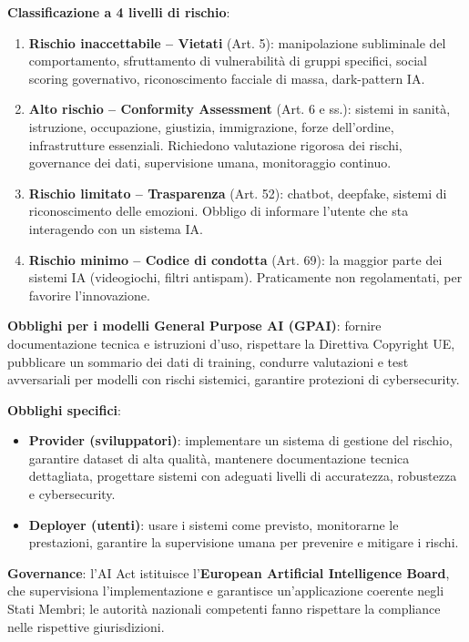 \documentclass[a4paper,11pt]{article}
\begin{document}
\textbf{Classificazione a 4 livelli di rischio}:
\begin{enumerate}
  \item \textbf{Rischio inaccettabile -- Vietati} (Art. 5): manipolazione subliminale del comportamento, sfruttamento di vulnerabilit\`{a} di gruppi specifici, social scoring governativo, riconoscimento facciale di massa, dark-pattern IA.
  \item \textbf{Alto rischio -- Conformity Assessment} (Art. 6 e ss.): sistemi in sanit\`{a}, istruzione, occupazione, giustizia, immigrazione, forze dell'ordine, infrastrutture essenziali. Richiedono valutazione rigorosa dei rischi, governance dei dati, supervisione umana, monitoraggio continuo.
  \item \textbf{Rischio limitato -- Trasparenza} (Art. 52): chatbot, deepfake, sistemi di riconoscimento delle emozioni. Obbligo di informare l'utente che sta interagendo con un sistema IA.
  \item \textbf{Rischio minimo -- Codice di condotta} (Art. 69): la maggior parte dei sistemi IA (videogiochi, filtri antispam). Praticamente non regolamentati, per favorire l'innovazione.
\end{enumerate}

\textbf{Obblighi per i modelli General Purpose AI (GPAI)}: fornire documentazione tecnica e istruzioni d'uso, rispettare la Direttiva Copyright UE, pubblicare un sommario dei dati di training, condurre valutazioni e test avversariali per modelli con rischi sistemici, garantire protezioni di cybersecurity.

\textbf{Obblighi specifici}:
\begin{itemize}
  \item \textbf{Provider (sviluppatori)}: implementare un sistema di gestione del rischio, garantire dataset di alta qualit\`{a}, mantenere documentazione tecnica dettagliata, progettare sistemi con adeguati livelli di accuratezza, robustezza e cybersecurity.
  \item \textbf{Deployer (utenti)}: usare i sistemi come previsto, monitorarne le prestazioni, garantire la supervisione umana per prevenire e mitigare i rischi.
\end{itemize}

\textbf{Governance}: l'AI Act istituisce l'\textbf{European Artificial Intelligence Board}, che supervisiona l'implementazione e garantisce un'applicazione coerente negli Stati Membri; le autorit\`{a} nazionali competenti fanno rispettare la compliance nelle rispettive giurisdizioni.
\end{document}
